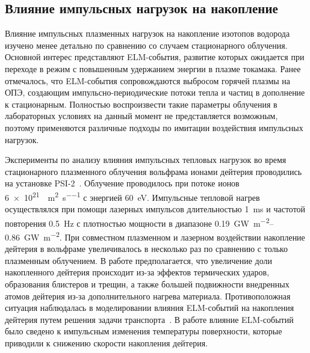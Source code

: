 \subsection{Влияние импульсных нагрузок на накопление}

Влияние импульсных плазменных нагрузок на накопление изотопов водорода изучено менее детально по сравнению со случаем стационарного облучения. Основной интерес представляют ELM-события, развитие которых ожидается при переходе в режим с повышенным удержанием энергии в плазме токамака. Ранее отмечалось, что ELM-события сопровождаются выбросом горячей плазмы на ОПЭ, создающим импульсно-периодические потоки тепла и частиц в дополнение к стационарным. Полностью воспроизвести такие параметры облучения в лабораторных условиях на данный момент не представляется возможным, поэтому применяются различные подходы по имитации воздействия импульсных нагрузок.

Эксперименты по анализу влияния импульсных тепловых нагрузок во время стационарного плазменного облучения вольфрама ионами дейтерия проводились на установке PSI-2~\cite{Huber2016_1, Huber2016_2}. Облучение проводилось при потоке ионов \SI{6e21}{\Deuterium\per\meter\squared\per\second} с энергией \SI{60}{\electronvolt}. Импульсные тепловой нагрев осуществлялся при помощи лазерных импульсов длительностью \SI{1}{\milli\second} и частотой повторения \SI{0.5}{\hertz} с плотностью мощности в диапазоне \SIrange{0.19}{0.86}{\giga\watt\per\meter\squared}. При совместном плазменном и лазерном воздействии накопление дейтерия в вольфраме увеличивалось в несколько раз по сравнению с только плазменным облучением. В работе предполагается, что увеличение доли накопленного дейтерия происходит из-за эффектов термических ударов, образования блистеров и трещин, а также большей подвижности внедренных атомов дейтерия из-за дополнительного нагрева материала. Противоположная ситуация наблюдалась в моделировании влияния ELM-событий на накопления дейтерия путем решения задачи транспорта~\cite{Hu2015}. В работе влияние ELM-событий было сведено к импульсным изменения температуры поверхности, которые приводили к снижению скорости накопления дейтерия.

